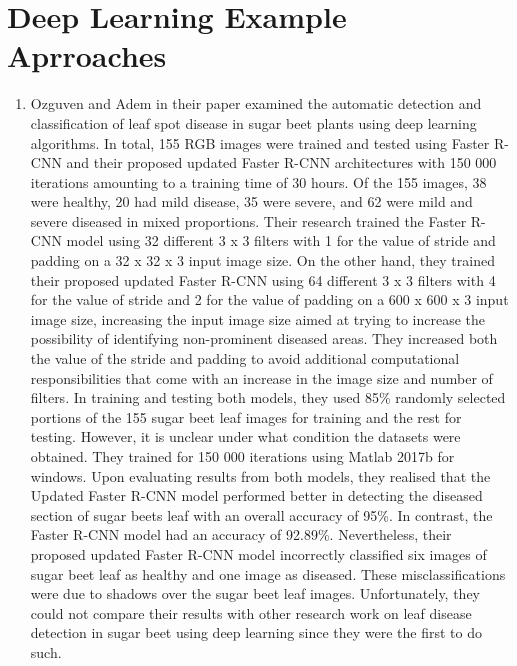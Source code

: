 \section{Deep Learning Example Aprroaches}\label{sec:deeplapproach}
\begin{enumerate}
\item Ozguven and Adem \cite{ozguven2019automatic} in their paper examined the automatic detection and classification of leaf spot disease in sugar beet plants using deep learning algorithms. In total, 155 RGB images were trained and tested using Faster R-CNN and their proposed updated Faster R-CNN architectures with 150 000 iterations amounting to a training time of 30 hours. Of the 155 images, 38 were healthy, 20 had mild disease, 35 were severe, and 62 were mild and severe diseased in mixed proportions.
Their research trained the Faster R-CNN model using 32 different 3 x 3 filters with 1 for the value of stride and padding on a 32 x 32 x 3 input image size. On the other hand, they trained their proposed updated Faster R-CNN using 64 different 3 x 3 filters with 4 for the value of stride and 2 for the value of padding on a 600 x 600 x 3 input image size, increasing the input image size aimed at trying to increase the possibility of identifying non-prominent diseased areas. They increased both the value of the stride and padding to avoid additional computational responsibilities that come with an increase in the image size and number of filters. In training and testing both models, they used 85\% randomly selected portions of the 155 sugar beet leaf images for training and the rest for testing. However, it is unclear under what condition the datasets were obtained. They trained for 150 000 iterations using Matlab 2017b for windows. Upon evaluating results from both models, they realised that the Updated Faster R-CNN model performed better in detecting the diseased section of sugar beets leaf with an overall accuracy of 95\%.
In contrast, the Faster R-CNN model had an accuracy of 92.89\%. Nevertheless, their proposed updated Faster R-CNN model incorrectly classified six images of sugar beet leaf as healthy and one image as diseased. These misclassifications were due to shadows over the sugar beet leaf images. Unfortunately, they could not compare their results with other research work on leaf disease detection in sugar beet using deep learning since they were the first to do such.


\end{enumerate}

